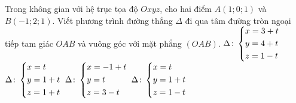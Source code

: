 \begin{ex}%
	Trong không gian với hệ trục tọa độ $ Oxyz $, cho hai điểm $ A(1;0;1) $ và $ B(-1;2;1) $. Viết phương trình đường thẳng $ \Delta $ đi qua tâm đường tròn ngoại tiếp tam giác $ OAB $ và vuông góc với mặt phẳng $ (OAB) $.
	\choice
	{$ \Delta\colon\left\{\begin{aligned}&x=3+t\\ &y=4+t\\ &z=1-t\end{aligned}\right. $}
	{$ \Delta\colon\left\{\begin{aligned}&x=t\\ &y=1+t\\ &z=1+t\end{aligned}\right. $}
	{$ \Delta\colon\left\{\begin{aligned}&x=-1+t\\ &y=t\\ &z=3-t\end{aligned}\right. $}
	{\True $ \Delta\colon\left\{\begin{aligned}&x=t\\ &y=1+t\\ &z=1-t\end{aligned}\right. $}
\end{ex}
